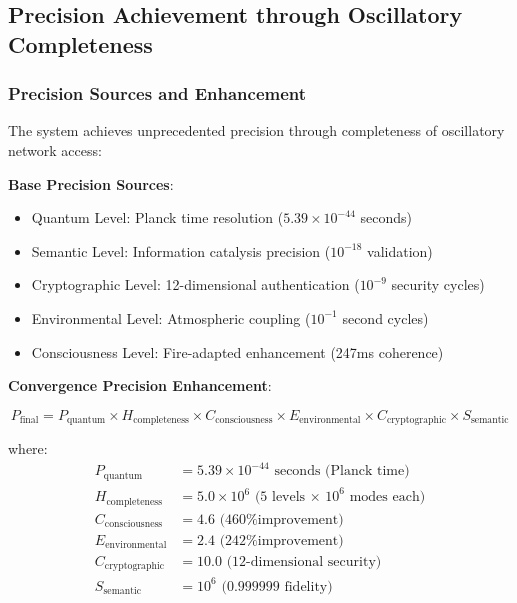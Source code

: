 \documentclass[12pt,a4paper]{article}
\begin{document}
{{{{{{{{{{{{{{\subsection{Precision Achievement through Oscillatory Completeness}

\subsubsection{Precision Sources and Enhancement}

The system achieves unprecedented precision through completeness of oscillatory network access:

\textbf{Base Precision Sources}:
\begin{itemize}
\item Quantum Level: Planck time resolution ($5.39 \times 10^{-44}$ seconds)
\item Semantic Level: Information catalysis precision ($10^{-18}$ validation)
\item Cryptographic Level: 12-dimensional authentication ($10^{-9}$ security cycles)
\item Environmental Level: Atmospheric coupling ($10^{-1}$ second cycles)
\item Consciousness Level: Fire-adapted enhancement (247ms coherence)
\end{itemize}

\textbf{Convergence Precision Enhancement}:

\begin{equation}
P_{\text{final}} = P_{\text{quantum}} \times H_{\text{completeness}} \times C_{\text{consciousness}} \times E_{\text{environmental}} \times C_{\text{cryptographic}} \times S_{\text{semantic}}
\end{equation}

where:
\begin{align}
P_{\text{quantum}} &= 5.39 \times 10^{-44} \text{ seconds (Planck time)} \\
H_{\text{completeness}} &= 5.0 \times 10^6 \text{ (5 levels × 10}^6 \text{ modes each)} \\
C_{\text{consciousness}} &= 4.6 \text{ (460\% improvement)} \\
E_{\text{environmental}} &= 2.4 \text{ (242\% improvement)} \\
C_{\text{cryptographic}} &= 10.0 \text{ (12-dimensional security)} \\
S_{\text{semantic}} &= 10^6 \text{ (0.999999 fidelity)}
\end{align}

}}}}}}}}}}}}}}
\end{document}
